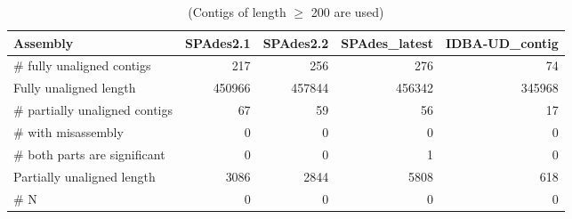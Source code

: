 \begin{table}[ht]
\begin{center}
\caption{(Contigs of length $\geq$ 200 are used)}
\begin{tabular}{|l*{4}{|r}|}
\hline
Assembly & SPAdes2.1 & SPAdes2.2 & SPAdes\_latest & IDBA-UD\_contig \\ \hline
\# fully unaligned contigs & 217 & 256 & 276 & 74 \\ \hline
Fully unaligned length & 450966 & 457844 & 456342 & 345968 \\ \hline
\# partially unaligned contigs & 67 & 59 & 56 & 17 \\ \hline
    \# with misassembly & 0 & 0 & 0 & 0 \\ \hline
    \# both parts are significant & 0 & 0 & 1 & 0 \\ \hline
Partially unaligned length & 3086 & 2844 & 5808 & 618 \\ \hline
\# N & 0 & 0 & 0 & 0 \\ \hline
\end{tabular}
\end{center}
\end{table}
